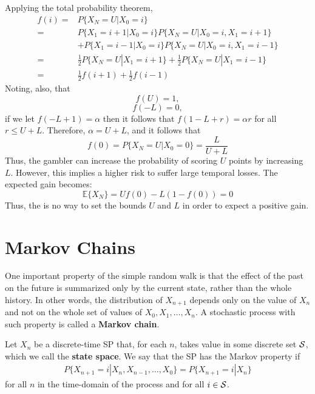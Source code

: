 Applying the total probability theorem,
\begin{align}
f(i) =& P\{X_N = U | X_0 = i\}  \nonumber \\
     =& P\{X_1 = i+1 | X_0 = i\} P\{X_N = U | X_0 = i, X_1 = i+1\}   \nonumber \\
      &+ P\{X_1 = i-1 | X_0 = i\} P\{X_N = U | X_0 = i, X_1 = i-1\}   \nonumber\\
     =& \frac12 P\{X_N = U | X_1 = i+1\} + \frac12 P\{X_N = U | X_1 = i-1\} \nonumber\\
     =& \frac12 f (i+1) + \frac12 f(i-1)
\end{align}
Noting, also, that 
$$f(U)=1,$$
$$f(-L) = 0,$$
if we let $f(-L+1) = \alpha$ then it follows that $f(1-L + r) = \alpha r$ for all $r \le U + L$. Therefore, $\alpha = U + L$, and it follows that 
$$
f(0) = P\{X_N = U | X_0 = 0\} = \frac{L}{U + L}
$$
Thus, the gambler can increase the probability of scoring $U$ points by increasing $L$. However, this implies a higher risk to suffer large temporal losses. The expected gain becomes:
$$
\mathbb{E}\{X_N\} = U f(0) - L (1-f(0)) = 0
$$
Thus, the is no way to set the bounds $U$ and $L$ in order to expect a positive gain.

\newpage


\section{Markov Chains}

One important property of the simple random walk is that the effect of the past on the future is summarized only by the current state, rather than the whole history. In other words, the distribution of $X_{n+1}$ depends only on the value of $X_n$ and not on the whole set of values of $X_0, X_1, \ldots, X_n$. A stochastic process with such property is called a \textbf{Markov chain}.

\begin{definition}
Let $X_n$ be a discrete-time SP that, for each $n$, takes value in some discrete set ${\cal S}$, which we call  the \textbf{state space}. We say that the SP has the Markov property if
\begin{align}
P\{X_{n+1} = i | X_n, X_{n-1}, \ldots, X_0\} = P\{X_{n+1} = i | X_n\}
\end{align}
for all $n$ in the time-domain of the process and for all $i \in {\cal S}$. 

\end{definition}

